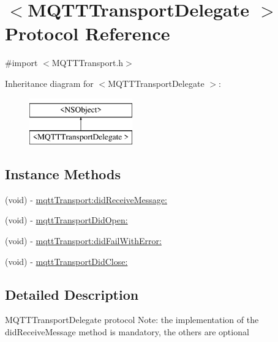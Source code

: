 \hypertarget{protocol_m_q_t_t_transport_delegate_01-p}{}\section{$<$M\+Q\+T\+T\+Transport\+Delegate $>$ Protocol Reference}
\label{protocol_m_q_t_t_transport_delegate_01-p}


{\ttfamily \#import $<$M\+Q\+T\+T\+Transport.\+h$>$}

Inheritance diagram for $<$M\+Q\+T\+T\+Transport\+Delegate $>$\+:\begin{figure}[H]
\begin{center}
\leavevmode
\includegraphics[height=2.000000cm]{protocol_m_q_t_t_transport_delegate_01-p}
\end{center}
\end{figure}
\subsection*{Instance Methods}
\begin{DoxyCompactItemize}
\item 
(void) -\/ \hyperlink{protocol_m_q_t_t_transport_delegate_01-p_a19668acdd5d230dd7080a22560ce06a1}{mqtt\+Transport\+:did\+Receive\+Message\+:}
\item 
(void) -\/ \hyperlink{protocol_m_q_t_t_transport_delegate_01-p_a90420bb9f04760681e64a4a799fe432b}{mqtt\+Transport\+Did\+Open\+:}
\item 
(void) -\/ \hyperlink{protocol_m_q_t_t_transport_delegate_01-p_a8a3b230eddcaa652f4e132c7a970d0f1}{mqtt\+Transport\+:did\+Fail\+With\+Error\+:}
\item 
(void) -\/ \hyperlink{protocol_m_q_t_t_transport_delegate_01-p_afa32c4b8636994afa1ad02c6453971ff}{mqtt\+Transport\+Did\+Close\+:}
\end{DoxyCompactItemize}


\subsection{Detailed Description}
M\+Q\+T\+T\+Transport\+Delegate protocol Note\+: the implementation of the did\+Receive\+Message method is mandatory, the others are optional 

